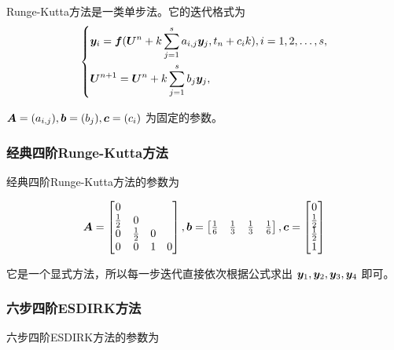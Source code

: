 \documentclass[lang=cn,a4paper,newtx,bibend=bibtex]{elegantpaper}
\begin{document}
Runge-Kutta方法是一类单步法。它的迭代格式为
\begin{equation*}
    \begin{aligned}
        \left\{
            \begin{aligned}
                & \bm{y}_i = \bm{f}(\bm{U}^n + k\sum_{j=1}^s a_{i,j}\bm{y}_j, t_n+c_ik), i=1,2,\dots,s,\\
                & \bm{U}^{n+1} = \bm{U}^n + k\sum_{j=1}^s b_j\bm{y}_j,
            \end{aligned}
        \right.
    \end{aligned}
\end{equation*}

$\bm{A}=(a_{i,j}), \bm{b}=(b_j), \bm{c}=(c_i)$ 为固定的参数。

\subsubsection{经典四阶Runge-Kutta方法}

经典四阶Runge-Kutta方法的参数为

\begin{equation*}
    \bm{A} = \begin{bmatrix} 
        0 & & & \\
        \frac 12 & 0 & & \\
        0 & \frac 12 & 0 & \\
        0 & 0 & 1 & 0 \\
     \end{bmatrix},
    \bm{b} = \begin{bmatrix} 
        \frac 16 & \frac 13 & \frac 13 & \frac 16 \\
     \end{bmatrix},
    \bm{c} = \begin{bmatrix} 
        0 \\
        \frac 12 \\
        \frac 12 \\
        1 \\
     \end{bmatrix}
\end{equation*}

它是一个显式方法，所以每一步迭代直接依次根据公式求出 $\bm{y}_1, \bm{y}_2, \bm{y}_3, \bm{y}_4$ 即可。

\subsubsection{六步四阶ESDIRK方法}

六步四阶ESDIRK方法的参数为
\end{document}
